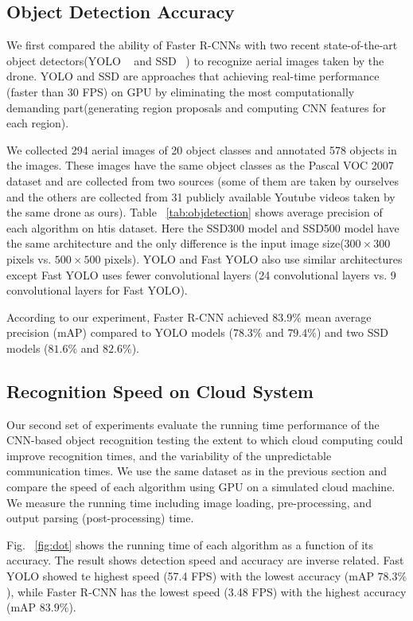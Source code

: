 \subsection{Object Detection Accuracy}
We first compared the ability of Faster R-CNNs with two recent state-of-the-art object detectors(YOLO ~\cite{yolo}
 and SSD ~\cite{ssd}) to recognize aerial images taken by the drone.
YOLO and SSD are approaches that achieving real-time performance (faster than 30 FPS) on GPU by eliminating the most computationally demanding part(generating region proposals and computing CNN features for each region). 

We collected 294 aerial images of 20 object classes and annotated 578 objects in the images. 
These images have the same object classes as the Pascal VOC 2007 dataset and are collected from two sources (some of them are taken by ourselves and the others are collected from 31 publicly available Youtube videos taken by the same drone as ours).
Table ~\ref{tab:objdetection} shows average precision of each algorithm on htis dataset. Here the SSD300 model and SSD500 model have the same architecture and the only difference is the input image size($300 \times 300$ pixels vs. $500 \times 500$ pixels). YOLO and Fast YOLO also use similar architectures except Fast YOLO uses fewer convolutional layers (24 convolutional layers vs. 9 convolutional layers for Fast YOLO).

According to our experiment, Faster R-CNN achieved $83.9\%$ mean average precision (mAP) compared to YOLO models ($78.3\%$ and $79.4\%$) and two SSD models ($81.6\%$ and $82.6\%$).

\subsection{Recognition Speed on Cloud System}
Our second set of experiments evaluate the running time performance of the CNN-based object recognition testing the extent to which cloud computing could improve recognition times, and the variability of the unpredictable communication times. We use the same dataset as in the previous section and compare the speed of each algorithm using GPU on a simulated cloud machine.
We measure the running time including image loading, pre-processing, and output parsing (post-processing) time.

Fig. ~\ref{fig:dot} shows the running time of each algorithm as a function of its accuracy. 
The result shows detection speed and accuracy are inverse related. Fast YOLO showed te highest speed (57.4 FPS) with the lowest accuracy (mAP $78.3\%$), while Faster R-CNN has the lowest speed (3.48 FPS) with the highest accuracy (mAP $83.9\%$).


